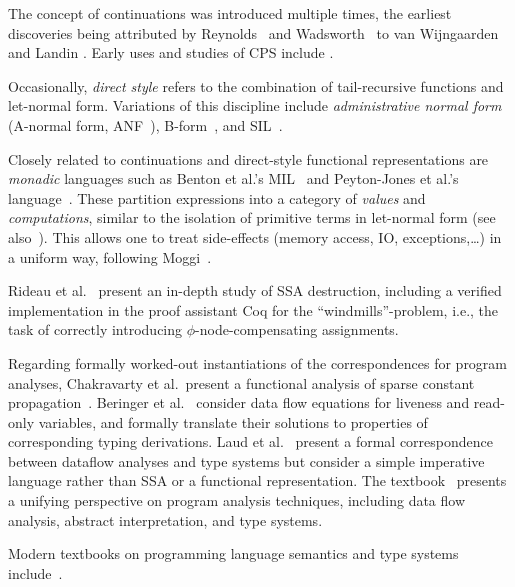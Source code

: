 The concept of continuations was introduced multiple times, the
earliest discoveries being attributed by
Reynolds~\cite{Reynolds:LSC1993} and Wadsworth~\cite{Wadsworth00} to
van Wijngaarden
\cite{vanWijngaarden1966} and Landin \cite{Landin1965}. Early uses
and studies of CPS include \cite{Reynolds:1972,Plotkin75}.  

Occasionally, \emph{direct style} refers to the combination of
tail-recursive functions and let-normal form. Variations of this
discipline include
\emph{administrative normal form} (A-normal form, ANF~\cite{DBLP:conf/pldi/FlanaganSDF93}), B-form~\cite{DBLP:conf/pldi/TarditiMCSHL96}, and SIL~\cite{DBLP:journals/jfp/TolmachO98}. 

Closely related to continuations and direct-style functional
representations are \emph{monadic} languages such as Benton et al.'s
MIL~\cite{BentonKennedyRussel:ICFP1998} and Peyton-Jones et al.'s
language~\cite{PeytonJonesShieldsLT:POPL1998}. These partition
expressions into a category of \emph{values} and \emph{computations},
similar to the isolation of primitive terms in let-normal form (see
also~\cite{Reynolds1974,Plotkin75}). This allows one to treat
side-effects (memory access, IO, exceptions,\ldots) in a uniform way,
following Moggi~\cite{Moggi1991}.

Rideau et al.~\cite{DBLP:journals/jar/RideauSL08} present an in-depth
study of SSA destruction, including a verified implementation in the
proof assistant Coq for the ``windmills''-problem, i.e., the task of
correctly introducing $\phi$-node-compensating assignments.

Regarding formally worked-out instantiations of the correspondences
for program analyses, Chakravarty et al.~present a functional analysis
of sparse constant propagation~\cite{ChakravartyKZ:COCV03}. Beringer
et al.~\cite{DBLP:journals/entcs/BeringerMS03} consider data flow
equations for liveness and read-only variables, and formally translate
their solutions to properties of corresponding typing
derivations. Laud et al.~\cite{DBLP:journals/tcs/LaudUV06} present a
formal correspondence between dataflow analyses and type systems but
consider a simple imperative language rather than SSA or a functional
representation. The textbook~\cite{NielsonNielsonHanking:POPA}
presents a unifying perspective on program analysis techniques,
including data flow analysis, abstract interpretation, and type
systems.

Modern textbooks on programming language semantics and type systems
include~\cite{winskel_93_formal,GunterBook,PierceTAPL}.

%
%
